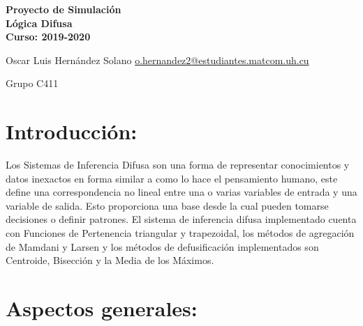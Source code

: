 \documentclass[10pt,letterpaper]{article}
\begin{document}
\begin{center}
	\textbf{Proyecto de Simulación}\\
	\textbf{Lógica Difusa}\\
	\textbf{Curso: 2019-2020}\\
\end{center}
		
\vspace{1.5cm}
		
Oscar Luis Hernández Solano \hspace{0.7cm}
\href{mailto:o.hernandez2@estudiantes.matcom.uh.cu}{o.hernandez2@estudiantes.matcom.uh.cu}

Grupo C411\\


\section{Introducción:}
Los Sistemas de Inferencia Difusa son una forma de representar conocimientos y datos inexactos en forma similar a como lo hace el pensamiento humano, este define una correspondencia no lineal entre una o varias variables de entrada y una variable de salida. Esto proporciona una base desde la cual pueden tomarse decisiones o definir patrones. El sistema de inferencia difusa implementado cuenta con Funciones de Pertenencia triangular y trapezoidal, los métodos de agregación de Mamdani y Larsen y los métodos de defusificación implementados son Centroide, Bisección y la Media de los Máximos.

\section{Aspectos generales:}
\end{document}
